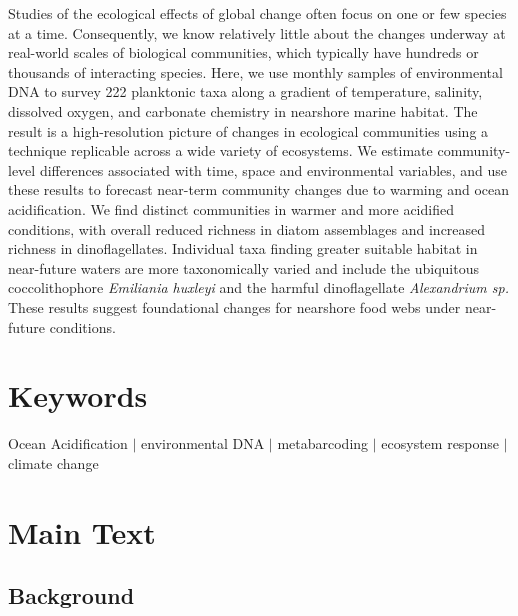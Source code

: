 \documentclass[11pt]{article}
\begin{document}
\begin{linenumbers}
Studies of the ecological effects of global change often focus on one or few species at a time. Consequently, we know relatively little about the changes underway at real-world scales of biological communities, which typically have hundreds or thousands of interacting species. Here, we use monthly samples of environmental DNA to survey 222 planktonic taxa along a gradient of temperature, salinity, dissolved oxygen, and carbonate chemistry in nearshore marine habitat. The result is a high-resolution picture of changes in ecological communities using a technique replicable across a wide variety of ecosystems. We estimate community-level differences associated with time, space and environmental variables, and use these results to forecast near-term community changes due to warming and ocean acidification. We find distinct communities in warmer and more acidified conditions, with overall reduced richness in diatom assemblages and increased richness in dinoflagellates. Individual taxa finding greater suitable habitat in near-future waters are more taxonomically varied and include the ubiquitous coccolithophore \textit{Emiliania huxleyi} and the harmful dinoflagellate \textit{Alexandrium sp.} These results suggest foundational changes for nearshore food webs under near-future conditions.




\section{Keywords}
Ocean Acidification $|$ environmental DNA $|$ metabarcoding $|$ ecosystem response $|$ climate change

\section{Main Text}


\subsection{Background}




\end{linenumbers}
\end{document}
